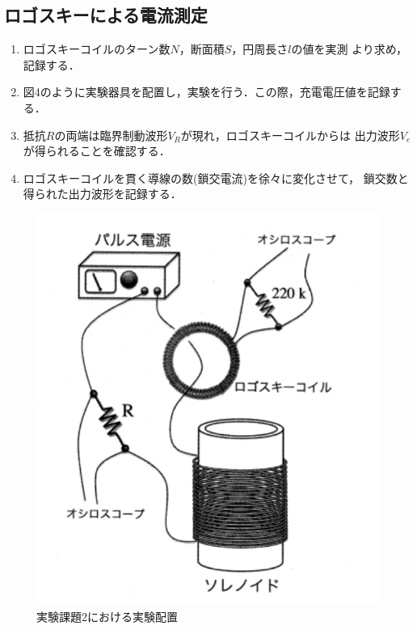 \newpage

\subsection{ロゴスキーによる電流測定}
\begin{enumerate}
    \item ロゴスキーコイルのターン数$N$，断面積$S$，円周長さ$l$の値を実測
    より求め，記録する．
    \item 図4のように実験器具を配置し，実験を行う．この際，充電電圧値を記録する．
    \item 抵抗$R$の両端は臨界制動波形$V_R$が現れ，ロゴスキーコイルからは
    出力波形$V_e$が得られることを確認する．
    \item ロゴスキーコイルを貫く導線の数(鎖交電流)を徐々に変化させて，
    鎖交数と得られた出力波形を記録する．
\end{enumerate}
\begin{figure}[!ht]
    \centering
    \includegraphics[scale=1]{figure4.pdf}
    \caption{実験課題2における実験配置}
\end{figure}